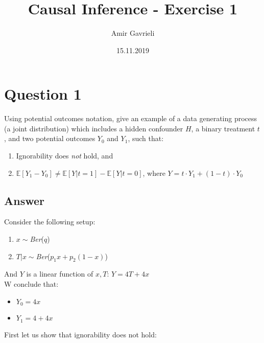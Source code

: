 \documentclass{article}
\title{Causal Inference - Exercise 1}
\author{Amir Gavrieli}
\date{15.11.2019}
\begin{document}
\maketitle

\section*{Question 1}
Using potential outcomes notation, give an example of a data generating process (a joint distribution) which includes a hidden confounder $H$, a binary treatment $t$, and two potential outcomes $Y_0$ and $Y_1$, such that:
\begin{enumerate}
    \item Ignorability does \textit{not} hold, and
    \item $\mathds{E}[Y_1-Y_0]\neq{}\mathds{E}[Y|t=1]-\mathds{E}[Y|t=0]$, where $Y=t\cdot{}Y_1+(1-t)\cdot{}Y_0$
\end{enumerate}

\subsection*{Answer}
Consider the following setup:
	\begin{enumerate}
		\item $x  {\sim}$\textit{Ber}($q$)
		\item $T|x  {\sim}$\textit{Ber}($p_1x+p_2(1-x)$)
	\end{enumerate}
	And $Y$ is a linear function of $x,T$: $Y=4T+4x$\\ 
	W conclude that:
	\begin{itemize}
		\item $Y_0= 4x$
		\item $Y_1= 4+4x$
	\end{itemize}
	
	First let us show that ignorability does not hold:
	\begin{equation*}

	\end{equation*}
	
\end{document}
